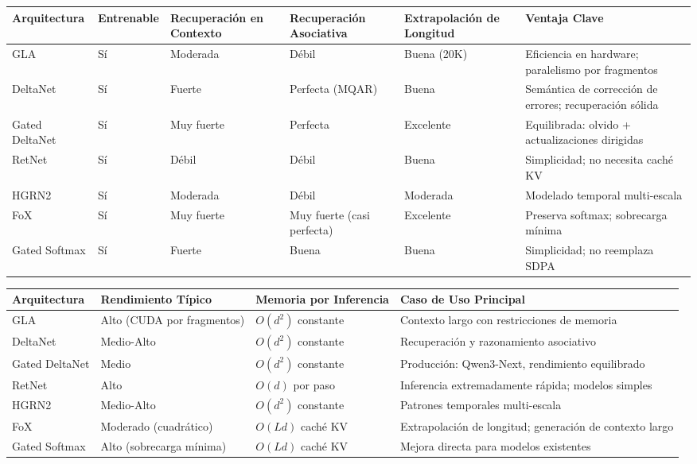 \documentclass[11pt,a4paper]{article}
\begin{document}
\footnotesize
\begin{longtable}{p{1.8cm}p{2.0cm}p{2.2cm}p{2.2cm}p{2.2cm}p{1.8cm}}
\toprule
\textbf{Arquitectura} & \textbf{Entrenable} & \textbf{Recuperación en Contexto} & \textbf{Recuperación Asociativa} & \textbf{Extrapolación de Longitud} & \textbf{Ventaja Clave} \\
\midrule
\endhead
GLA & Sí & Moderada & Débil & Buena (20K) & Eficiencia en hardware; paralelismo por fragmentos \\
DeltaNet & Sí & Fuerte & Perfecta (MQAR) & Buena & Semántica de corrección de errores; recuperación sólida \\
Gated DeltaNet & Sí & Muy fuerte & Perfecta & Excelente & Equilibrada: olvido + actualizaciones dirigidas \\
RetNet & Sí & Débil & Débil & Buena & Simplicidad; no necesita caché KV \\
HGRN2 & Sí & Moderada & Débil & Moderada & Modelado temporal multi-escala \\
FoX & Sí & Muy fuerte & Muy fuerte (casi perfecta) & Excelente & Preserva softmax; sobrecarga mínima \\
Gated Softmax & Sí & Fuerte & Buena & Buena & Simplicidad; no reemplaza SDPA \\
\bottomrule
\end{longtable}
\normalsize

\medskip

\footnotesize
\begin{longtable}{p{2.0cm}p{2.4cm}p{2.8cm}p{3.4cm}}
\toprule
\textbf{Arquitectura} & \textbf{Rendimiento Típico} & \textbf{Memoria por Inferencia} & \textbf{Caso de Uso Principal} \\
\midrule
\endhead
GLA & Alto (CUDA por fragmentos) & $O(d^2)$ constante & Contexto largo con restricciones de memoria \\
DeltaNet & Medio-Alto & $O(d^2)$ constante & Recuperación y razonamiento asociativo \\
Gated DeltaNet & Medio & $O(d^2)$ constante & Producción: Qwen3-Next, rendimiento equilibrado \\
RetNet & Alto & $O(d)$ por paso & Inferencia extremadamente rápida; modelos simples \\
HGRN2 & Medio-Alto & $O(d^2)$ constante & Patrones temporales multi-escala \\
FoX & Moderado (cuadrático) & $O(Ld)$ caché KV & Extrapolación de longitud; generación de contexto largo \\
Gated Softmax & Alto (sobrecarga mínima) & $O(Ld)$ caché KV & Mejora directa para modelos existentes \\
\bottomrule
\end{longtable}
\normalsize
\end{document}
